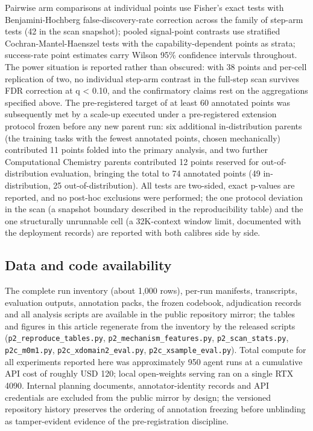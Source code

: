Pairwise arm comparisons at individual points use Fisher's exact tests with Benjamini-Hochberg false-discovery-rate correction across the family of step-arm tests (42 in the scan snapshot); pooled signal-point contrasts use stratified Cochran-Mantel-Haenszel tests with the capability-dependent points as strata; success-rate point estimates carry Wilson 95\% confidence intervals throughout. The power situation is reported rather than obscured: with 38 points and per-cell replication of two, no individual step-arm contrast in the full-step scan survives FDR correction at q < 0.10, and the confirmatory claims rest on the aggregations specified above. The pre-registered target of at least 60 annotated points was subsequently met by a scale-up executed under a pre-registered extension protocol frozen before any new parent run: six additional in-distribution parents (the training tasks with the fewest annotated points, chosen mechanically) contributed 11 points folded into the primary analysis, and two further Computational Chemistry parents contributed 12 points reserved for out-of-distribution evaluation, bringing the total to 74 annotated points (49 in-distribution, 25 out-of-distribution). All tests are two-sided, exact p-values are reported, and no post-hoc exclusions were performed; the one protocol deviation in the scan (a snapshot boundary described in the reproducibility table) and the one structurally unrunnable cell (a 32K-context window limit, documented with the deployment records) are reported with both calibres side by side.

\subsection*{Data and code availability}

The complete run inventory (about 1,000 rows), per-run manifests, transcripts, evaluation outputs, annotation packs, the frozen codebook, adjudication records and all analysis scripts are available in the public repository mirror; the tables and figures in this article regenerate from the inventory by the released scripts (\texttt{p2\_reproduce\_tables.py}, \texttt{p2\_mechanism\_features.py}, \texttt{p2\_scan\_stats.py}, \texttt{p2c\_m0m1.py}, \texttt{p2c\_xdomain2\_eval.py}, \texttt{p2c\_xsample\_eval.py}). Total compute for all experiments reported here was approximately 950 agent runs at a cumulative API cost of roughly USD 120; local open-weights serving ran on a single RTX 4090. Internal planning documents, annotator-identity records and API credentials are excluded from the public mirror by design; the versioned repository history preserves the ordering of annotation freezing before unblinding as tamper-evident evidence of the pre-registration discipline.
